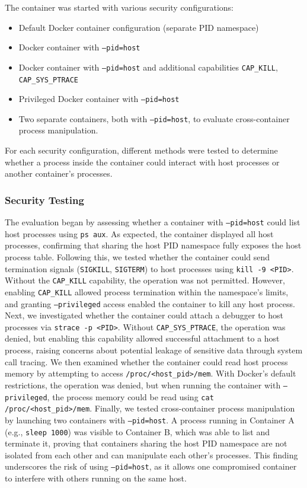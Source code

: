 The container was started with various security configurations:

\begin{itemize}
    \item Default Docker container configuration (separate PID namespace)
    \item Docker container with \texttt{--pid=host}
    \item Docker container with \texttt{--pid=host} and additional capabilities \texttt{CAP\_KILL}, \texttt{CAP\_SYS\_PTRACE}
    \item Privileged Docker container with \texttt{--pid=host}
    \item Two separate containers, both with \texttt{--pid=host}, to evaluate cross-container process manipulation.
\end{itemize}

For each security configuration, different methods were tested to determine whether a process inside the container could interact with host processes or another container’s processes.

\subsubsection{Security Testing}

The evaluation began by assessing whether a container with \texttt{--pid=host} could list host processes using \texttt{ps aux}. As expected, the container displayed all host processes, confirming that sharing the host PID namespace fully exposes the host process table. Following this, we tested whether the container could send termination signals (\texttt{SIGKILL}, \texttt{SIGTERM}) to host processes using \texttt{kill -9 <PID>}. Without the \texttt{CAP\_KILL} capability, the operation was not permitted. However, enabling \texttt{CAP\_KILL} allowed process termination within the namespace's limits, and granting \texttt{--privileged} access enabled the container to kill any host process. Next, we investigated whether the container could attach a debugger to host processes via \texttt{strace -p <PID>}. Without \texttt{CAP\_SYS\_PTRACE}, the operation was denied, but enabling this capability allowed successful attachment to a host process, raising concerns about potential leakage of sensitive data through system call tracing. We then examined whether the container could read host process memory by attempting to access \texttt{/proc/<host\_pid>/mem}. With Docker’s default restrictions, the operation was denied, but when running the container with \texttt{--privileged}, the process memory could be read using \texttt{cat /proc/<host\_pid>/mem}. Finally, we tested cross-container process manipulation by launching two containers with \texttt{--pid=host}. A process running in Container A (e.g., \texttt{sleep 1000}) was visible to Container B, which was able to list and terminate it, proving that containers sharing the host PID namespace are not isolated from each other and can manipulate each other's processes. This finding underscores the risk of using \texttt{--pid=host}, as it allows one compromised container to interfere with others running on the same host.

